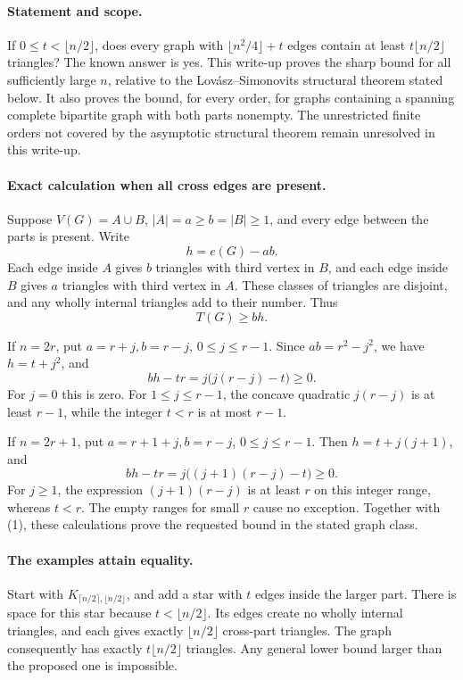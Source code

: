 \paragraph{Statement and scope.}
If \(0\leq t<\lfloor n/2\rfloor\), does every graph with \(\lfloor n^2/4\rfloor+t\) edges contain at least \(t\lfloor n/2\rfloor\) triangles? The known answer is yes. This write-up proves the sharp bound for all sufficiently large \(n\), relative to the Lov\'asz--Simonovits structural theorem stated below. It also proves the bound, for every order, for graphs containing a spanning complete bipartite graph with both parts nonempty. The unrestricted finite orders not covered by the asymptotic structural theorem remain unresolved in this write-up.

\paragraph{Exact calculation when all cross edges are present.}
Suppose \(V(G)=A\cup B\), \(|A|=a\geq b=|B|\geq1\), and every edge between the parts is present. Write
\[
 h=e(G)-ab.
\]
Each edge inside \(A\) gives \(b\) triangles with third vertex in \(B\), and each edge inside \(B\) gives \(a\) triangles with third vertex in \(A\). These classes of triangles are disjoint, and any wholly internal triangles add to their number. Thus
\[
 T(G)\geq b h.
\tag{1}
\]

If \(n=2r\), put \(a=r+j,b=r-j\), \(0\leq j\leq r-1\). Since \(ab=r^2-j^2\), we have \(h=t+j^2\), and
\[
 b h-tr=j\bigl(j(r-j)-t\bigr)\geq0.
\]
For \(j=0\) this is zero. For \(1\leq j\leq r-1\), the concave quadratic \(j(r-j)\) is at least \(r-1\), while the integer \(t<r\) is at most \(r-1\).

If \(n=2r+1\), put \(a=r+1+j,b=r-j\), \(0\leq j\leq r-1\). Then \(h=t+j(j+1)\), and
\[
 b h-tr=j\bigl((j+1)(r-j)-t\bigr)\geq0.
\]
For \(j\geq1\), the expression \((j+1)(r-j)\) is at least \(r\) on this integer range, whereas \(t<r\). The empty ranges for small \(r\) cause no exception. Together with (1), these calculations prove the requested bound in the stated graph class.

\paragraph{The examples attain equality.}
Start with \(K_{\lceil n/2\rceil,\lfloor n/2\rfloor}\), and add a star with \(t\) edges inside the larger part. There is space for this star because \(t<\lfloor n/2\rfloor\). Its edges create no wholly internal triangles, and each gives exactly \(\lfloor n/2\rfloor\) cross-part triangles. The graph consequently has exactly \(t\lfloor n/2\rfloor\) triangles. Any general lower bound larger than the proposed one is impossible.

